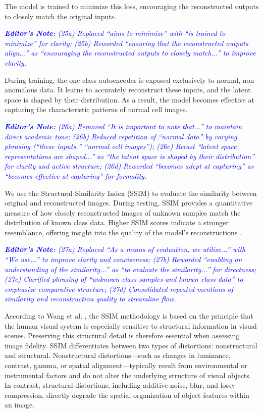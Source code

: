 \documentclass[journal,12pt,onecolumn,draftcls]{IEEEtran}
\newcommand{\editornote}[1]{\par\textit{\textcolor{blue}{\textbf{Editor's Note:} #1}}\par}
\begin{document}
The model is trained to minimize this loss, encouraging the reconstructed outputs to closely match the original inputs.

\editornote{(25a) Replaced “aims to minimize” with “is trained to minimize” for clarity;
(25b) Reworded “ensuring that the reconstructed outputs align...” as “encouraging the reconstructed outputs to closely match...” to improve clarity.}

During training, the one-class autoencoder is exposed exclusively to normal, non-anomalous data. It learns to accurately reconstruct these inputs, and the latent space is shaped by their distribution. As a result, the model becomes effective at capturing the characteristic patterns of normal cell images.

\editornote{(26a) Removed “It is important to note that...” to maintain direct academic tone; 
(26b) Reduced repetition of “normal data” by varying phrasing (“these inputs,” “normal cell images”); 
(26c) Recast “latent space representations are shaped...” as “the latent space is shaped by their distribution” for clarity and active structure; 
(26d) Reworded “becomes adept at capturing” as “becomes effective at capturing” for formality.}

We use the Structural Similarity Index (SSIM) to evaluate the similarity between original and reconstructed images. During testing, SSIM provides a quantitative measure of how closely reconstructed images of unknown samples match the distribution of known class data. Higher SSIM scores indicate a stronger resemblance, offering insight into the quality of the model’s reconstructions \cite{fu2017}.

\editornote{(27a) Replaced “As a means of evaluation, we utilize...” with “We use...” to improve clarity and conciseness; 
(27b) Reworded “enabling an understanding of the similarity...” as “to evaluate the similarity...” for directness; 
(27c) Clarified phrasing of “unknown class samples and known class data” to emphasize comparative structure; 
(27d) Consolidated repeated mentions of similarity and reconstruction quality to streamline flow.}

According to Wang et al. \cite{wang2009}, the SSIM methodology is based on the principle that the human visual system is especially sensitive to structural information in visual scenes. Preserving this structural detail is therefore essential when assessing image fidelity. SSIM differentiates between two types of distortions: nonstructural and structural. Nonstructural distortions—such as changes in luminance, contrast, gamma, or spatial alignment—typically result from environmental or instrumental factors and do not alter the underlying structure of visual objects. In contrast, structural distortions, including additive noise, blur, and lossy compression, directly degrade the spatial organization of object features within an image.
\end{document}
